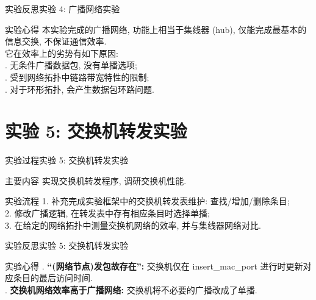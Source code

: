 \documentclass{beamer}
\begin{document}
\begin{frame}{实验反思}{实验 4: 广播网络实验}
    \begin{block}{实验心得}
        本实验完成的广播网络,
        功能上相当于集线器 (hub),
        仅能完成最基本的信息交换, 不保证通信效率.\\
        它在效率上的劣势有如下原因:\\
        . 无条件广播数据包, 没有单播选项; \\
        . 受到网络拓扑中链路带宽特性的限制;\\
        . 对于环形拓扑, 会产生数据包环路问题.
    \end{block}

\end{frame}


\section{实验 5: 交换机转发实验}
\begin{frame}
    \sectionpage
\end{frame}

\begin{frame}{实验过程}{实验 5: 交换机转发实验}
    \begin{block}{主要内容}
        实现交换机转发程序, 调研交换机性能.
    \end{block}

    \begin{block}{实验流程}
        1. 补充完成实验框架中的交换机转发表维护: 查找/增加/删除条目;\\
        2. 修改广播逻辑, 在转发表中存有相应条目时选择单播;\\
        3. 在给定的网络拓扑中测量交换机网络的效率, 并与集线器网络对比.
    \end{block}
\end{frame}

\begin{frame}{实验反思}{实验 5: 交换机转发实验}
    \begin{block}{实验心得}
        . \textbf{“(网络节点)发包故存在”:}
        交换机仅在 insert\_mac\_port 进行时更新对应条目的最后访问时间.\\
        . \textbf{交换机网络效率高于广播网络:} 交换机将不必要的广播改成了单播.
    \end{block}
\end{frame}
\end{document}
